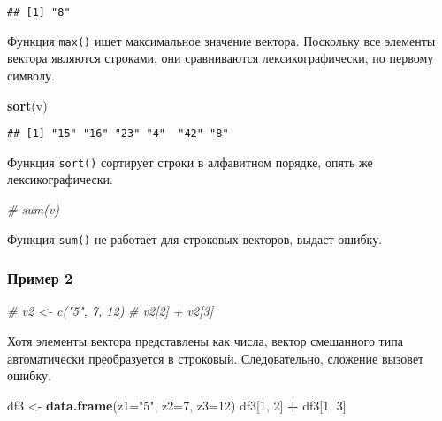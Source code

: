 \documentclass[
]{article}
\newenvironment{Shaded}{\begin{snugshade}}{\end{snugshade}}
\newcommand{\AttributeTok}[1]{\textcolor[rgb]{0.13,0.29,0.53}{#1}}
\newcommand{\CommentTok}[1]{\textcolor[rgb]{0.56,0.35,0.01}{\textit{#1}}}
\newcommand{\DecValTok}[1]{\textcolor[rgb]{0.00,0.00,0.81}{#1}}
\newcommand{\FunctionTok}[1]{\textcolor[rgb]{0.13,0.29,0.53}{\textbf{#1}}}
\newcommand{\NormalTok}[1]{#1}
\newcommand{\OtherTok}[1]{\textcolor[rgb]{0.56,0.35,0.01}{#1}}
\newcommand{\SpecialCharTok}[1]{\textcolor[rgb]{0.81,0.36,0.00}{\textbf{#1}}}
\newcommand{\StringTok}[1]{\textcolor[rgb]{0.31,0.60,0.02}{#1}}
\begin{document}
\begin{verbatim}
## [1] "8"
\end{verbatim}

Функция \texttt{max()} ищет максимальное значение вектора. Поскольку все
элементы вектора являются строками, они сравниваются лексикографически,
по первому символу.

\begin{Shaded}
\begin{Highlighting}[]
\FunctionTok{sort}\NormalTok{(v)}
\end{Highlighting}
\end{Shaded}

\begin{verbatim}
## [1] "15" "16" "23" "4"  "42" "8"
\end{verbatim}

Функция \texttt{sort()} сортирует строки в алфавитном порядке, опять же
лексикографически.

\begin{Shaded}
\begin{Highlighting}[]
\CommentTok{\# sum(v)}
\end{Highlighting}
\end{Shaded}

Функция \texttt{sum()} не работает для строковых векторов, выдаст
ошибку.

\subsubsection{Пример 2}\label{ux43fux440ux438ux43cux435ux440-2}

\begin{Shaded}
\begin{Highlighting}[]
\CommentTok{\# v2 \textless{}{-} c("5", 7, 12)}
\CommentTok{\# v2[2] + v2[3]}
\end{Highlighting}
\end{Shaded}

Хотя элементы вектора представлены как числа, вектор смешанного типа
автоматически преобразуется в строковый. Следовательно, сложение вызовет
ошибку.

\begin{Shaded}
\begin{Highlighting}[]
\NormalTok{df3 }\OtherTok{\textless{}{-}} \FunctionTok{data.frame}\NormalTok{(}\AttributeTok{z1=}\StringTok{"5"}\NormalTok{, }\AttributeTok{z2=}\DecValTok{7}\NormalTok{, }\AttributeTok{z3=}\DecValTok{12}\NormalTok{)}
\NormalTok{df3[}\DecValTok{1}\NormalTok{, }\DecValTok{2}\NormalTok{] }\SpecialCharTok{+}\NormalTok{ df3[}\DecValTok{1}\NormalTok{, }\DecValTok{3}\NormalTok{]}
\end{Highlighting}
\end{Shaded}
\end{document}
